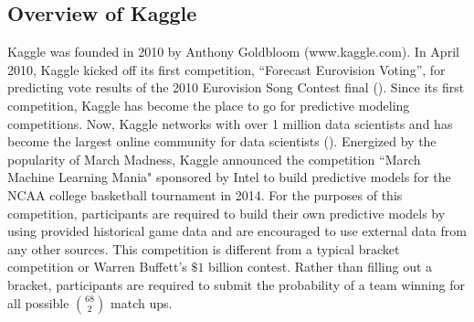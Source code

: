 \subsection{Overview of Kaggle}
Kaggle was founded in 2010 by Anthony Goldbloom (www.kaggle.com). In April 2010, Kaggle kicked off its first competition, ``Forecast Eurovision Voting”, for predicting vote results of the 2010 Eurovision Song Contest final (\cite{kagglefirst}). Since its first competition, Kaggle has become the place to go for predictive modeling competitions. Now, Kaggle networks with over 1 million data scientists and has become the largest online community for data scientists (\cite{kaggleuser}). Energized by the popularity of March Madness, Kaggle announced the competition ``March Machine Learning Mania" sponsored by Intel to build predictive models for the NCAA college basketball tournament in 2014. For the purposes of this competition, participants are required to build their own predictive models by using provided historical game data and are encouraged to use external data from any other sources. This competition is different from a typical bracket competition or Warren Buffett's $\$ 1$ billion contest. Rather than filling out a bracket, participants are required to submit the probability of a team winning for all possible $68 \choose 2$ match ups.

